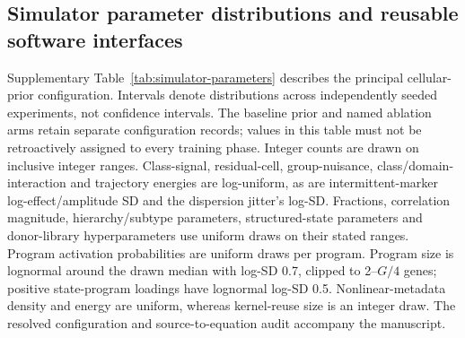 \subsection*{Simulator parameter distributions and reusable software interfaces}
\label{sec:technical-simulator}

Supplementary Table~\ref{tab:simulator-parameters} describes the principal cellular-prior configuration. Intervals denote distributions across independently seeded experiments, not confidence intervals. The baseline prior and named ablation arms retain separate configuration records; values in this table must not be retroactively assigned to every training phase. Integer counts are drawn on inclusive integer ranges. Class-signal, residual-cell, group-nuisance, class/domain-interaction and trajectory energies are log-uniform, as are intermittent-marker log-effect/amplitude SD and the dispersion jitter's log-SD. Fractions, correlation magnitude, hierarchy/subtype parameters, structured-state parameters and donor-library hyperparameters use uniform draws on their stated ranges. Program activation probabilities are uniform draws per program. Program size is lognormal around the drawn median with log-SD 0.7, clipped to 2--$G/4$ genes; positive state-program loadings have lognormal log-SD 0.5. Nonlinear-metadata density and energy are uniform, whereas kernel-reuse size is an integer draw. The resolved configuration and source-to-equation audit accompany the manuscript.

